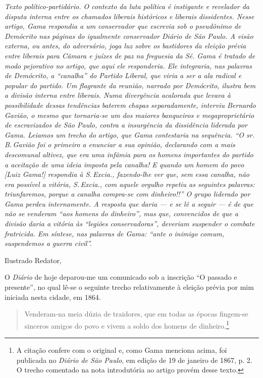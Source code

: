 \begin{didascalia}\itshape
Texto político-partidário. O contexto da luta política é instigante e
revelador da disputa interna entre os chamados liberais históricos e
liberais dissidentes. Nesse artigo, Gama respondia a um conservador que
escrevia sob o pseudônimo de Demócrito nas páginas do igualmente
conservador \textnormal{Diário de São Paulo}. A visão externa, ou antes, do
adversário, joga luz sobre os bastidores da eleição prévia entre
liberais para Câmara e juízes de paz na freguesia da Sé. Gama é tratado
de modo pejorativo no artigo, que aqui ele responderia. Ele
integraria, nas palavras de Demócrito, a ``canalha'' do Partido
Liberal, que viria a ser a ala radical e popular do partido. Um
flagrante da reunião, narrado por Demócrito, ilustra bem a divisão
interna entre liberais. Numa divergência acalorada que levava à
possibilidade dessas tendências baterem chapas separadamente, interviu
Bernardo Gavião, o mesmo que tornaria-se um dos maiores banqueiros e
megaproprietário de escravizados de São Paulo, contra a insurgência da
dissidência liderada por Gama. Leiamos um trecho do artigo, que Gama
contestaria na sequência. ``O sr.\,B.\,Gavião foi o primeiro a enunciar a
sua opinião, declarando com a mais descomunal altivez, \textnormal{que era uma
infâmia para os homens importantes do partido a aceitação de uma ideia
imposta pela canalha!} E quando um homem do povo {[}Luiz Gama!{]}
respondia à S.\,Excia., fazendo-lhe ver que, sem \textnormal{essa canalha}, não
era possível a vitória, S.\,Excia., com aquele orgulho repetiu as
seguintes palavras: triunfaremos, porque a canalha compra-se com
dinheiro!!'' O grupo liderado por Gama perdeu internamente. A resposta
que daria --- e se lê a seguir --- é de que não se venderam ``aos homens do
dinheiro'', mas que, convencidos de que a divisão daria a vitória às
``legiões conservadoras'', deveriam suspender o combate fratricida. Em
síntese, nas palavras de Gama: ``ante o inimigo comum, suspendemos a
guerra civil''.
\end{didascalia}



Ilustrado Redator,

O \emph{Diário} de hoje deparou-me um comunicado sob a inscrição ``O
passado e presente'', no qual lê-se o seguinte trecho relativamente à
eleição prévia por mim iniciada nesta cidade, em 1864.


\begin{quote}
Venderam-na meia dúzia de traidores, que em todas as épocas fingem-se
sinceros amigos do povo e vivem a soldo dos homens de
dinheiro.\footnote{A citação confere com o original e, como Gama
  menciona acima, foi publicada no \emph{Diário de São Paulo}, em edição
  de 19 de janeiro de 1867, p. 2. O trecho comentado na nota introdutória ao artigo
  provém desse texto.}
\end{quote}

